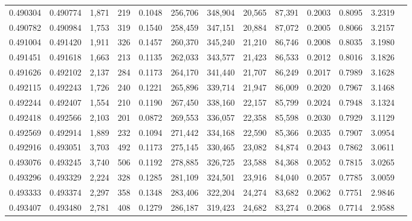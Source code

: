 \begin{tabular}{rrrrrrrrrrrrr}
0.490304 & 0.490774 & 1,871 &   219 &                                     0.1048 & 256,706 & 348,904 &  20,565 &  87,391 & 0.2003 & 0.8095 & 3.2319 \\
0.490782 & 0.490984 & 1,753 &   319 &                                     0.1540 & 258,459 & 347,151 &  20,884 &  87,072 & 0.2005 & 0.8066 & 3.2157 \\
0.491004 & 0.491420 & 1,911 &   326 &                                     0.1457 & 260,370 & 345,240 &  21,210 &  86,746 & 0.2008 & 0.8035 & 3.1980 \\
0.491451 & 0.491618 & 1,663 &   213 &                                     0.1135 & 262,033 & 343,577 &  21,423 &  86,533 & 0.2012 & 0.8016 & 3.1826 \\
0.491626 & 0.492102 & 2,137 &   284 &                                     0.1173 & 264,170 & 341,440 &  21,707 &  86,249 & 0.2017 & 0.7989 & 3.1628 \\
0.492115 & 0.492243 & 1,726 &   240 &                                     0.1221 & 265,896 & 339,714 &  21,947 &  86,009 & 0.2020 & 0.7967 & 3.1468 \\
0.492244 & 0.492407 & 1,554 &   210 &                                     0.1190 & 267,450 & 338,160 &  22,157 &  85,799 & 0.2024 & 0.7948 & 3.1324 \\
0.492418 & 0.492566 & 2,103 &   201 &                                     0.0872 & 269,553 & 336,057 &  22,358 &  85,598 & 0.2030 & 0.7929 & 3.1129 \\
0.492569 & 0.492914 & 1,889 &   232 &                                     0.1094 & 271,442 & 334,168 &  22,590 &  85,366 & 0.2035 & 0.7907 & 3.0954 \\
0.492916 & 0.493051 & 3,703 &   492 &                                     0.1173 & 275,145 & 330,465 &  23,082 &  84,874 & 0.2043 & 0.7862 & 3.0611 \\
0.493076 & 0.493245 & 3,740 &   506 &                                     0.1192 & 278,885 & 326,725 &  23,588 &  84,368 & 0.2052 & 0.7815 & 3.0265 \\
0.493296 & 0.493329 & 2,224 &   328 &                                     0.1285 & 281,109 & 324,501 &  23,916 &  84,040 & 0.2057 & 0.7785 & 3.0059 \\
0.493333 & 0.493374 & 2,297 &   358 &                                     0.1348 & 283,406 & 322,204 &  24,274 &  83,682 & 0.2062 & 0.7751 & 2.9846 \\
0.493407 & 0.493480 & 2,781 &   408 &                                     0.1279 & 286,187 & 319,423 &  24,682 &  83,274 & 0.2068 & 0.7714 & 2.9588 \\

\end{tabular}
